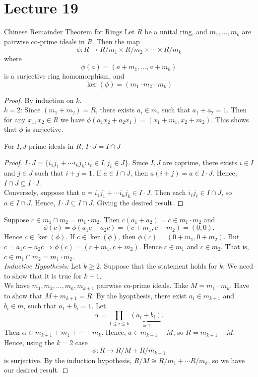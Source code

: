 \documentclass[twoside, openright, fontsize=10pt, headings=big]{scrbook}
\begin{document}
\chapter{Lecture 19}
\begin{theorem}{Chinese Remainder Theorem for Rings}{}
    Let $R$ be a unital ring, and $m_1,\dots,m_k$ are pairwise co-prime ideals in $R$. Then the map
    \[
        \phi:R\to R/m_1\times R/m_2\times\cdots\times R/m_k
    \]
    where
    \[
        \phi(a)=(a+m_1,\dots,a+m_k)
    \]
    is a surjective ring homomorphism, and 
    \[
        \ker(\phi)=(m_1\cdot m_2\cdots m_k)
    \]
\end{theorem}
\begin{proof}
    By induction on $k$.\\
    $k=2$: Since $(m_1+m_2)=R$, there exists $a_i\in m_i$ such that $a_1+a_2=1$. Then for any $x_1,x_2\in R$ we have $\phi(a_1x_2+a_2x_1)=(x_1+m_1,x_2+m_2)$. This shows that $\phi$ is surjective.
    \begin{lemma}{}{}
        For $I,J$ prime ideals in $R$, $I\cdot J=I\cap J$
    \end{lemma}
    \begin{proof}
        $I\cdot J=\{i_1j_1+\cdots i_kj_k:i_\ell\in I,j_\ell\in J\}$. Since $I,J$ are coprime, there exists $i\in I$ and $j\in J$ such that $i+j=1$. If $a\in I\cap J$, then $a(i+j)=a\in I\cdot J$. Hence, $I\cap J\subseteq I\cdot J$.\\
        Conversely, suppose that $a=i_1j_1+\cdots i_kj_k\in I\cdot J$. Then each $i_\ell j_\ell\in I\cap J$, so $a\in I\cap J$. Hence, $I\cdot J\subseteq I\cap J$. Giving the desired result. 
    \end{proof}
    Suppose $c\in m_1\cap m_2=m_1\cdot m_2$. Then $c(a_1+a_2)=c\in m_1\cdot m_2$ and
    \[
        \phi(c)=\phi(a_1c+a_2c)=(c+m_1,c+m_2)=(0,0).
    \]
    Hence $c\in\ker(\phi)$. If $c\in\ker(\phi)$, then $\phi(c)=(0+m_1,0+m_2)$. But $c=a_1c+a_2c\Rightarrow\phi(c)=(c+m_1,c+m_2)$. Hence $c\in m_1$ and $c\in m_2$. That is, $c\in m_1\cap m_2=m_1\cdot m_2$.\\
    \textit{Inductive Hypothesis:} Let $k\geq2$. Suppose that the statement holds for $k$. We need to show that it is true for $k+1$.\\
    We have $m_1,m_2,\dots,m_k,m_{k+1}$ pairwise co-prime ideals. Take $M=m_1\cdots m_k$. Have to show that $M+m_{k+1}=R$. By the hyopthesis, there exist $a_i\in m_{k+1}$ and $b_i\in m_i$ such that $a_1+b_i=1$. Let
    \[
        \alpha=\prod_{1\leq i\leq k}\underbrace{(a_i+b_i)}_{=1}. 
    \]
    Then $\alpha\in m_{k+1}+m_1+\cdots+m_k$. Hence, $a\in m_{k+1}+M$, so $R=m_{k+1}+M$. Hence, using the $k=2$ case
    \[
        \phi:R\to R/M+R/m_{k+1}
    \]
    is surjective. By the induction hypothesis, $R/M\cong R/m_1+\cdots R/m_k$, so we have our desired result. 
\end{proof}
\end{document}
